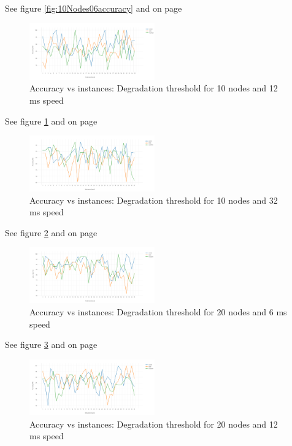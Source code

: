 \documentclass[letterpaper, 10 pt, conference]{ieeeconf}  %
\begin{document}
See figure \ref{fig:10Nodes06accuracy} and on page \pageref{fig:10Nodes06accuracy}

\begin{figure}[H]
\includegraphics[width=0.48\textwidth]{10Nodes12accuracy.png}
\caption{Accuracy vs instances: Degradation threshold for 10 nodes and 12 ms speed}
\label{fig:10Nodes12accuracy}
\end{figure}

See figure \ref{fig:10Nodes12accuracy} and on page \pageref{fig:10Nodes12accuracy}



\begin{figure}[H]
\includegraphics[width=0.48\textwidth]{10Nodes32accuracy}
\caption{Accuracy vs instances: Degradation threshold for 10 nodes and 32 ms speed}
\label{fig:10Nodes32accuracy}
\end{figure}

See figure \ref{fig:10Nodes32accuracy} and on page \pageref{fig:10Nodes32accuracy}




\begin{figure}[H]
\includegraphics[width=0.48\textwidth]{20Nodes06accuracy}
\caption{Accuracy vs instances: Degradation threshold for 20 nodes and 6 ms speed}
\label{fig:20Nodes06accuracy}
\end{figure}

See figure \ref{fig:20Nodes06accuracy} and on page \pageref{fig:20Nodes06accuracy}

\begin{figure}[H]
\includegraphics[width=0.48\textwidth]{20Nodes12accuracy.png}
\caption{Accuracy vs instances: Degradation threshold for 20 nodes and 12 ms speed}
\label{fig:20Nodes12accuracy}
\end{figure}
\end{document}

